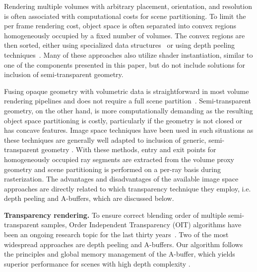 \documentclass{egpubl}
\newcommand{\ab}{\mbox{A-buffer}}
\begin{document}
Rendering multiple volumes with arbitrary placement, orientation, and resolution is often associated with computational costs for scene partitioning. 
To limit the per frame rendering cost, object space is often separated into convex regions homogeneously occupied by a fixed number of volumes. 
The convex regions are then sorted, either using specialized data structures~\cite{grimm04vobjects,lindholm2009fused,Lux2009} or using depth peeling techniques~\cite{Plate2007,rossler08multishader}. 
Many of these approaches also utilize shader instantiation, similar to one of the components presented in this paper, but do not include solutions for inclusion of semi-transparent geometry. 

Fusing opaque geometry with volumetric data is straightforward in most volume rendering pipelines and does not require a full scene partition~\cite{engel2006volume}. 
Semi-transparent geometry, on the other hand, is more computationally demanding as the resulting object space partitioning is costly, particularly if the geometry is not closed or has concave features. 
Image space techniques have been used in such situations as these techniques are generally well adapted to inclusion of generic, semi-transparent geometry \cite{brecheisen08multimodal,kainz2009ray}. 
With these methods, entry and exit points for homogeneously occupied ray segments are extracted from the volume proxy geometry and scene partitioning is performed on a per-ray basis during rasterization.
The advantages and disadvantages of the available image space approaches are directly related to which transparency technique they employ, i.e. depth peeling and \ab{}s, which are discussed below. 


\noindent\textbf{Transparency rendering.}
%
To ensure correct blending order of multiple semi-transparent samples, Order Independent Transparency (OIT) algorithms have been an ongoing research topic for the last thirty years~\cite{Maule2011}. 
Two of the most widespread approaches are depth peeling and \ab{}s. 
Our algorithm follows the principles and global memory management of the \ab{}, which yields superior performance for scenes with high depth complexity \cite{Yang2010,Kauker2013}. 
\end{document}
